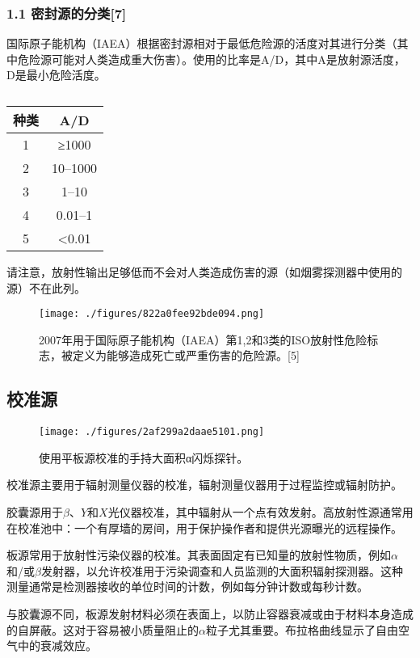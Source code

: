 \subsubsection{1.1 密封源的分类[7]}
国际原子能机构（IAEA）根据密封源相对于最低危险源的活度对其进行分类（其中危险源可能对人类造成重大伤害）。使用的比率是A/D，其中A是放射源活度，D是最小危险活度。
\begin{table}[ht]
\centering
\caption\label{FSY}
\begin{tabular}{|c|c}
\hline
\textbf{种类} & \textbf{A/D}\\
\hline
1 & ≥1000\\
\hline
2 & 10–1000\\
\hline
3 & 1–10\\
\hline
4 & 0.01–1\\
\hline
5 & <0.01\\
\hline
\end{tabular}
\end{table}
请注意，放射性输出足够低而不会对人类造成伤害的源（如烟雾探测器中使用的源）不在此列。
\begin{figure}[ht]
\centering
\texttt{[image: ./figures/822a0fee92bde094.png]}
\caption{2007年用于国际原子能机构（IAEA）第1,2和3类的ISO放射性危险标志，被定义为能够造成死亡或严重伤害的危险源。[5]} \label{fig_FSY_1}
\end{figure}

\subsection{校准源}
\begin{figure}[ht]
\centering
\texttt{[image: ./figures/2af299a2daae5101.png]}
\caption{使用平板源校准的手持大面积α闪烁探针。} \label{fig_FSY_2}
\end{figure}
校准源主要用于辐射测量仪器的校准，辐射测量仪器用于过程监控或辐射防护。

胶囊源用于$\beta$、$Y$和$X$光仪器校准，其中辐射从一个点有效发射。高放射性源通常用在校准池中：一个有厚墙的房间，用于保护操作者和提供光源曝光的远程操作。

板源常用于放射性污染仪器的校准。其表面固定有已知量的放射性物质，例如$\alpha$和/或$\beta$发射器，以允许校准用于污染调查和人员监测的大面积辐射探测器。这种测量通常是检测器接收的单位时间的计数，例如每分钟计数或每秒计数。

与胶囊源不同，板源发射材料必须在表面上，以防止容器衰减或由于材料本身造成的自屏蔽。这对于容易被小质量阻止的$\alpha$粒子尤其重要。布拉格曲线显示了自由空气中的衰减效应。


